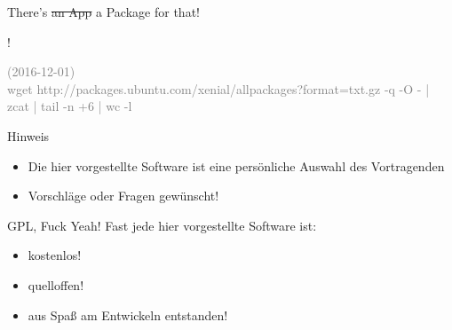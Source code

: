 \begin{frame}{There's \st{an App} a Package for that!}

\begin{center}
{\fontsize{100}{90}!}
\end{center}
\vfill

\textcolor{gray}{\tiny (2016-12-01) \\ wget http://packages.ubuntu.com/xenial/allpackages?format=txt.gz -q -O - | zcat | tail -n +6 | wc -l}
\end{frame}


\begin{frame}{Hinweis}
\begin{itemize}
\item Die hier vorgestellte Software ist eine persönliche Auswahl des Vortragenden
\item Vorschläge oder Fragen gewünscht!
\end{itemize}
\end{frame}

\begin{frame}{GPL, Fuck Yeah!}
Fast jede hier vorgestellte Software ist:
\begin{itemize}
\item kostenlos!
\item quelloffen!
\item aus Spaß am Entwickeln entstanden!
\end{itemize}
\end{frame}